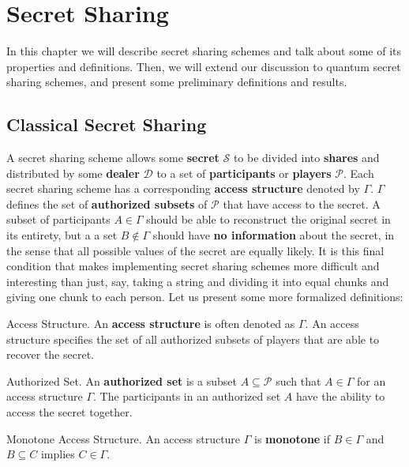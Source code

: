 \chapter{Secret Sharing}
\label{ch:ss}

In this chapter we will describe secret sharing schemes and talk about some of its properties and definitions. Then, we will extend our discussion to quantum secret sharing schemes, and present some preliminary definitions and results.

\section{Classical Secret Sharing}
\label{sec:css}

 A secret sharing scheme allows some \textbf{secret} $\mathcal{S}$ to be divided into \textbf{shares} and distributed by some \textbf{dealer} $\mathcal{D}$ to a set of \textbf{participants} or \textbf{players} $\mathcal{P}$. Each secret sharing scheme has a corresponding \textbf{access structure} denoted by $\Gamma$. $\Gamma$ defines the set of \textbf{authorized subsets} of $\mathcal{P}$ that have access to the secret. A subset of participants $A \in \Gamma$ should be able to reconstruct the original secret in its entirety, but a a set $B \notin \Gamma$ should have \textbf{no information} about the secret, in the sense that all possible values of the secret are equally likely. It is this final condition that makes implementing secret sharing schemes more difficult and interesting than just, say, taking a string and dividing it into equal chunks and giving one chunk to each person. Let us present some more formalized definitions:

\begin{definition}{Access Structure.}
    \label{defn:access-structure}
    An \textbf{access structure} is often denoted as $\Gamma$. An access structure specifies the set of all authorized subsets of players that are able to recover the secret.
\end{definition}

\begin{definition}{Authorized Set.}
    \label{defn:authorized-set}
    An \textbf{authorized set} is a subset $A \subseteq \mathcal{P}$ such that $A \in \Gamma$ for an access structure $\Gamma$. The participants in an authorized set $A$ have the ability to access the secret together.
\end{definition}

\begin{definition}{Monotone Access Structure.}
    \label{defn:monotone}
    An access structure $\Gamma$ is \textbf{monotone} if $B \in \Gamma$ and $B \subseteq C$ implies $C \in \Gamma$.
\end{definition}

